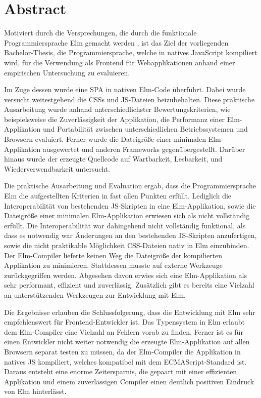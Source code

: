 \chapter*{Abstract}
\label{sec:Abstract}
Motiviert durch die Versprechungen, die durch die funktionale Programmiersprache Elm gemacht werden \cite[Vgl.]{elm-no-runtime-errors}, ist das Ziel der vorliegenden Bachelor-Thesis, die Programmiersprache, welche in natives JavaScript kompiliert wird, für die Verwendung als Frontend für Webapplikationen anhand einer empirischen Untersuchung zu evaluieren.

Im Zuge dessen wurde eine \acl{SPA} in nativen Elm-Code überführt. Dabei wurde versucht weitestgehend die \acl{CSS}s und \acl{JS}-Dateien beizubehalten. Diese praktische Ausarbeitung wurde anhand unterschiedlichster Bewertungskriterien, wie beispielsweise die Zuverlässigkeit der Applikation, die Performanz einer Elm-Applikation und Portabilität zwischen unterschiedlichen Betriebssystemen und Browsern evaluiert. Ferner wurde die Dateigröße einer minimalen Elm-Applikation ausgewertet und anderen Frameworks gegenübergestellt. Darüber hinaus wurde der erzeugte Quellcode auf Wartbarkeit, Lesbarkeit, und Wiederverwendbarkeit untersucht.

Die praktische Ausarbeitung und Evaluation ergab, dass die Programmiersprache Elm die aufgestellten Kriterien in fast allen Punkten erfüllt. Lediglich die Interoperabilität von bestehenden \ac{JS}-Skripten in eine Elm-Applikation, sowie die Dateigröße einer minimalen Elm-Applikation erwiesen sich als nicht vollständig erfüllt. Die Interoperabilität war dahingehend nicht vollständig funktional, als dass es notwendig war Änderungen an den bestehenden \ac{JS}-Skripten anzufertigen, sowie die nicht praktikable Möglichkeit \ac{CSS}-Dateien nativ in Elm einzubinden. Der Elm-Compiler lieferte keinen Weg die Dateigröße der kompilierten Applikation zu minimieren. Stattdessen musste auf externe Werkzeuge zurückgegriffen werden. Abgesehen davon erwies sich eine Elm-Applikation als sehr performant, effizient und zuverlässig. Zusätzlich gibt es bereits eine Vielzahl an unterstützenden Werkzeugen zur Entwicklung mit Elm.

Die Ergebnisse erlauben die Schlussfolgerung, dass die Entwicklung mit Elm sehr empfehlenswert für Frontend-Entwickler ist. Das Typensystem in Elm erlaubt dem Elm-Compiler eine Vielzahl an Fehlern vorab zu finden. Ferner ist es für einen Entwickler nicht weiter notwendig die erzeugte Elm-Applikation auf allen Browsern separat testen zu müssen, da der Elm-Compiler die Applikation in natives \ac{JS} kompiliert, welches kompatibel mit dem ECMAScript-Standard ist. Daraus entsteht eine enorme Zeitersparnis, die gepaart mit einer effizienten Applikation und einem zuverlässigen Compiler einen deutlich positiven Eindruck von Elm hinterlässt.
